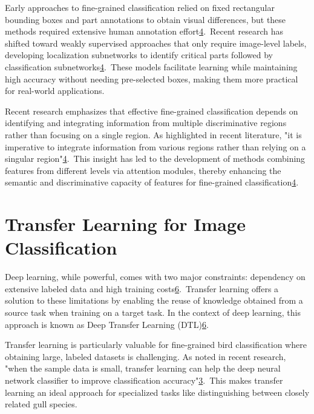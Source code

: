 \documentclass[a4paper,12pt]{article}
\begin{document}
Early approaches to fine-grained classification relied on fixed rectangular bounding boxes and part annotations to obtain visual differences, but these methods required extensive human annotation effort\href{https://www.frontiersin.org/journals/neurorobotics/articles/10.3389/fnbot.2024.1391791/full}{4}. Recent research has shifted toward weakly supervised approaches that only require image-level labels, developing localization subnetworks to identify critical parts followed by classification subnetworks\href{https://www.frontiersin.org/journals/neurorobotics/articles/10.3389/fnbot.2024.1391791/full}{4}. These models facilitate learning while maintaining high accuracy without needing pre-selected boxes, making them more practical for real-world applications.

Recent research emphasizes that effective fine-grained classification depends on identifying and integrating information from multiple discriminative regions rather than focusing on a single region. As highlighted in recent literature, "it is imperative to integrate information from various regions rather than relying on a singular region"\href{https://www.frontiersin.org/journals/neurorobotics/articles/10.3389/fnbot.2024.1391791/full}{4}. This insight has led to the development of methods combining features from different levels via attention modules, thereby enhancing the semantic and discriminative capacity of features for fine-grained classification\href{https://www.frontiersin.org/journals/neurorobotics/articles/10.3389/fnbot.2024.1391791/full}{4}.

\section*{Transfer Learning for Image Classification}
Deep learning, while powerful, comes with two major constraints: dependency on extensive labeled data and high training costs\href{https://arxiv.org/abs/2201.09679}{6}. Transfer learning offers a solution to these limitations by enabling the reuse of knowledge obtained from a source task when training on a target task. In the context of deep learning, this approach is known as Deep Transfer Learning (DTL)\href{https://arxiv.org/abs/2201.09679}{6}.

Transfer learning is particularly valuable for fine-grained bird classification where obtaining large, labeled datasets is challenging. As noted in recent research, "when the sample data is small, transfer learning can help the deep neural network classifier to improve classification accuracy"\href{https://ijece.iaescore.com/index.php/IJECE/article/view/24833}{3}. This makes transfer learning an ideal approach for specialized tasks like distinguishing between closely related gull species.
\end{document}
